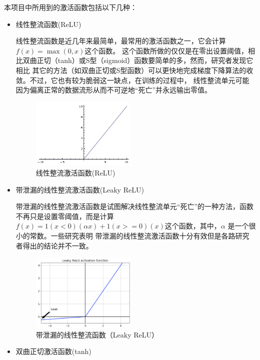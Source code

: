 \documentclass[supercite]{HustGraduPaper}
\theoremstyle{definition}
\begin{document}
本项目中所用到的激活函数包括以下几种：
\begin{itemize}
  \item 线性整流函数(ReLU)
  
  线性整流函数是近几年来最简单，最常用的激活函数之一，它会计算$f(x)=\max(0,x)$这个函数。
  这个函数所做的仅仅是在零出设置阈值，相比双曲正切（tanh）或S型（sigmoid）函数要简单的多，然而，研究者发现它相比
  其它的方法（如双曲正切或S型函数）可以更快地完成梯度下降算法的收敛。不过，它也有较为脆弱这一缺点，在训练的过程中，
  线性整流单元可能因为偏离正常的数据流形从而不可逆地“死亡”并永远输出零值。 
  \begin{figure}[H]
      \begin{center}
      \includegraphics[width=5cm]{images/relu}
      \end{center}
      \caption{线性整流激活函数(ReLU)}
      \label{fig:ReLU}
  \end{figure}

  \item 带泄漏的线性整流激活函数(Leaky ReLU)
  
  带泄漏的线性整流激活函数是试图解决线性整流单元“死亡”的一种方法，函数不再只是设置零阈值，而是计算
  $f(x)=1(x<0)(\alpha x)+1(x>=0)(x)$这个函数，其中，$\alpha$ 是一个很小的常数。一些研究表明
  带泄漏的线性整流激活函数十分有效但是各路研究者得出的结论并不一致。
  \begin{figure}[H]
      \begin{center}
      \includegraphics[width=5cm]{images/leakyrelu}
      \end{center}
      \caption{带泄漏的线性整流函数（Leaky ReLU）}
      \label{fig:Leaky ReLU}
  \end{figure}

  \item 双曲正切激活函数(tanh)
  

\end{itemize}
\end{document}
